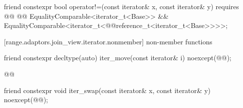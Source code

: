 {\begin{itemdescr}
\pnum
\oldtxt{\returns} 
\end{itemdescr}

\begin{itemdecl}
friend constexpr bool operator!=(const iterator& x, const iterator& y)
  requires @@
    @@ EqualityComparable<iterator_t<Base>> &&
    EqualityComparable<iterator_t<@@reference_t<iterator_t<Base>>>>;
\end{itemdecl}

\begin{itemdescr}
\pnum
\oldtxt{\returns} 
\end{itemdescr}

[range.adaptors.join_view.iterator.nonmember]{ non-member functions}

\begin{itemdecl}
friend constexpr decltype(auto) iter_move(const iterator& i)
  noexcept(@\oldtxt{\seebelow}@);
\end{itemdecl}

\begin{itemdescr}
\pnum
\oldtxt{\returns} 

\pnum
{}
\begin{codeblock}
@@
\end{codeblock}
\end{itemdescr}

\begin{itemdecl}
friend constexpr void iter_swap(const iterator& x, const iterator& y)
  noexcept(@\oldtxt{\seebelow}@);
\end{itemdecl}

\begin{itemdescr}
\pnum
\oldtxt{\returns} 


\end{itemdescr}}
